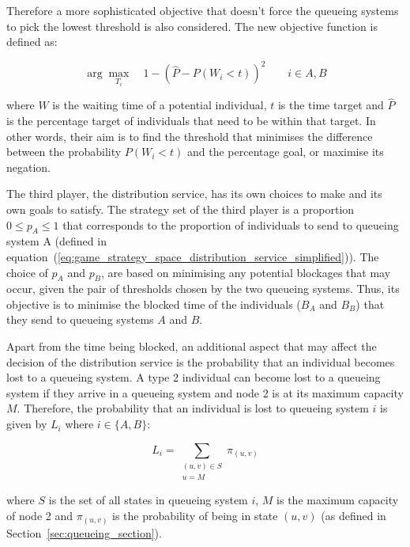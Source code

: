Therefore a more sophisticated objective that doesn't force the queueing systems
to pick the lowest threshold is also considered.
The new objective function is defined as:

\begin{equation}\label{eq:obj_queueing_systems}
    \arg \max_{T_i} \quad 1 - \left( \hat{P} - P(W_i < t) \right)^2
    \qquad i \in {A, B}
\end{equation}

where \(W\) is the waiting time of a potential individual, \(t\) is the time
target and \(\hat{P}\) is the percentage target of individuals that need to be
within that target.
In other words, their aim is to find the threshold that minimises the
difference between the probability \(P(W_i < t)\) and the percentage goal,
or maximise its negation.

The third player, the distribution service, has its own choices to make and
its own goals to satisfy.
The strategy set of the third player is a proportion \(0 \leq p_A \leq 1\)
that corresponds to the proportion of individuals to send to queueing system A
(defined in
equation~(\ref{eq:game_strategy_space_distribution_service_simplified})).
The choice of \(p_A\) and \(p_B\), are based on minimising any potential
blockages that may occur, given the pair of thresholds chosen by the two
queueing systems.
Thus, its objective is to minimise the blocked time of the individuals
(\(B_A\) and \(B_B\)) that they send to queueing systems \(A\) and \(B\).

Apart from the time being blocked, an additional aspect that may affect the
decision of the distribution service is the probability that an individual
becomes lost to a queueing system.
A type 2 individual can become lost to a queueing system if they arrive in a
queueing system and node 2 is at its maximum capacity \(M\).
Therefore, the probability that an individual is lost to queueing system \(i\)
is given by \(L_i\) where \(i \in \{A, B\}\):

\begin{equation}\label{eq:probability_lost}
    L_i = \sum_{\substack{(u, v) \in S \\ u = M}} \pi_{(u, v)}
\end{equation}

where \(S\) is the set of all states in queueing system \(i\), \(M\) is the
maximum capacity of node 2 and \(\pi_{(u, v)}\) is the probability of being in
state \((u, v)\) (as defined in Section~\ref{sec:queueing_section}).

